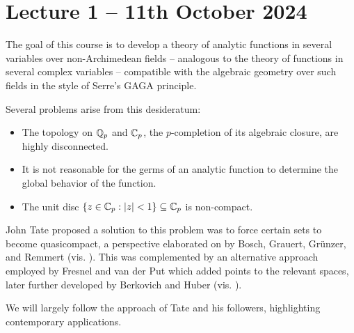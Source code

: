 \section{Lecture 1 -- 11th October 2024}\label{sec: lecture 1}
The goal of this course is to develop a theory of analytic functions in several variables over non-Archimedean fields -- analogous to the theory of functions in several complex variables -- compatible with the algebraic geometry over such fields in the style of Serre's GAGA principle. 

Several problems arise from this desideratum:
\begin{itemize}
    \item The topology on $\mathbb{Q}_{p}$ and $\mathbb{C}_{p}$, the $p$-completion of its algebraic closure, are highly disconnected. 
    \item It is not reasonable for the germs of an analytic function to determine the global behavior of the function. 
    \item The unit disc $\{z\in\mathbb{C}_{p}:|z|<1\}\subseteq\mathbb{C}_{p}$ is non-compact. 
\end{itemize}
John Tate proposed a solution to this problem was to force certain sets to become quasicompact, a perspective elaborated on by Bosch, Grauert, Gr\"{u}nzer, and Remmert (vis. \cite{BGR}). This was complemented by an alternative approach employed by Fresnel and van der Put which added points to the relevant spaces, later further developed by Berkovich and Huber (vis. \cite{Berkovich,FvdP,Huber}). 

We will largely follow the approach of Tate and his followers, highlighting contemporary applications. 

